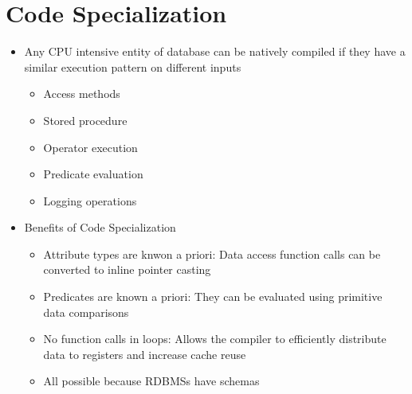 \documentclass[11pt]{article}
\begin{document}
\section{Code Specialization}
\begin{itemize}
    \item Any CPU intensive entity of database can be natively compiled if they have a similar execution pattern on different inputs
    \begin{itemize}
        \item Access methods
        \item Stored procedure
        \item Operator execution
        \item Predicate evaluation
        \item Logging operations
    \end{itemize}
    \item Benefits of Code Specialization
    \begin{itemize}
        \item Attribute types are knwon a priori: Data access function calls can be converted to inline pointer casting
        \item Predicates are known a priori: They can be evaluated using primitive data comparisons
        \item No function calls in loops: Allows the compiler to efficiently distribute data to registers and increase cache reuse
        \item All possible because RDBMSs have schemas
    \end{itemize}
\end{itemize}
\end{document}
